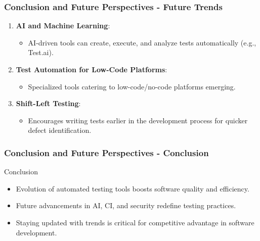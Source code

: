\documentclass{beamer}
\begin{document}
\begin{frame}[fragile]
    \frametitle{Conclusion and Future Perspectives - Future Trends}
    \begin{enumerate}
        \item \textbf{AI and Machine Learning}:
        \begin{itemize}
            \item AI-driven tools can create, execute, and analyze tests automatically (e.g., Test.ai).
        \end{itemize}

        \item \textbf{Test Automation for Low-Code Platforms}:
        \begin{itemize}
            \item Specialized tools catering to low-code/no-code platforms emerging.
        \end{itemize}

        \item \textbf{Shift-Left Testing}:
        \begin{itemize}
            \item Encourages writing tests earlier in the development process for quicker defect identification.
        \end{itemize}
    \end{enumerate}
\end{frame}

\begin{frame}[fragile]
    \frametitle{Conclusion and Future Perspectives - Conclusion}
    \begin{block}{Conclusion}
        \begin{itemize}
            \item Evolution of automated testing tools boosts software quality and efficiency.
            \item Future advancements in AI, CI, and security redefine testing practices.
            \item Staying updated with trends is critical for competitive advantage in software development.
        \end{itemize}
    \end{block}
\end{frame}
\end{document}

